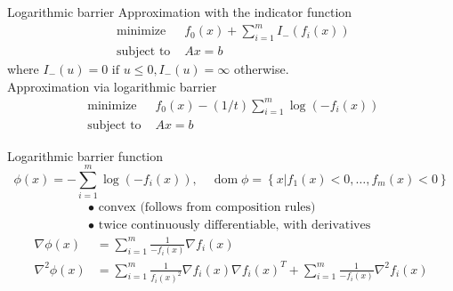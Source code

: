 \documentclass{beamer}
\begin{document}

\begin{frame}[noframenumbering]{Logarithmic barrier}
	\alert{Approximation with the indicator function}
	\begin{equation*}
	\begin{array}{ll}{\text { minimize }} & {f_{0}(x)+\sum_{i=1}^{m} I_{-}\left(f_{i}(x)\right)} \\ {\text { subject to }} & {A x=b}\end{array}
	\end{equation*}
where
	$I_{-}(u)=0 \text { if } u \leq 0, I_{-}(u)=\infty
	$ otherwise.\\ [0.4cm]
	\alert{Approximation via logarithmic barrier}
	\begin{equation*}
	\begin{array}{ll}{\text { minimize }} & {f_{0}(x)-(1 / t) \sum_{i=1}^{m} \log \left(-f_{i}(x)\right)} \\ {\text { subject to }} & {A x=b}\end{array}
	\end{equation*}
\end{frame}

\begin{frame}[noframenumbering]{Logarithmic barrier function}
	\begin{equation*}
	\phi(x)=-\sum_{i=1}^{m} \log \left(-f_{i}(x)\right), \quad \operatorname{dom} \phi=\left\{x | f_{1}(x)<0, \ldots, f_{m}(x)<0\right\}
	\end{equation*}
	\begin{equation*}
	\begin{array}{l}{\bullet \text { convex (follows from composition rules) }} \\ {\bullet \text { twice continuously differentiable, with derivatives }}\end{array}
	\end{equation*}
	\begin{equation*}
	\begin{aligned} \nabla \phi(x) &=\sum_{i=1}^{m} \frac{1}{-f_{i}(x)} \nabla f_{i}(x) \\ \nabla^{2} \phi(x) &=\sum_{i=1}^{m} \frac{1}{f_{i}(x)^{2}} \nabla f_{i}(x) \nabla f_{i}(x)^{T}+\sum_{i=1}^{m} \frac{1}{-f_{i}(x)} \nabla^{2} f_{i}(x) \end{aligned}
	\end{equation*}
\end{frame}
\end{document}
